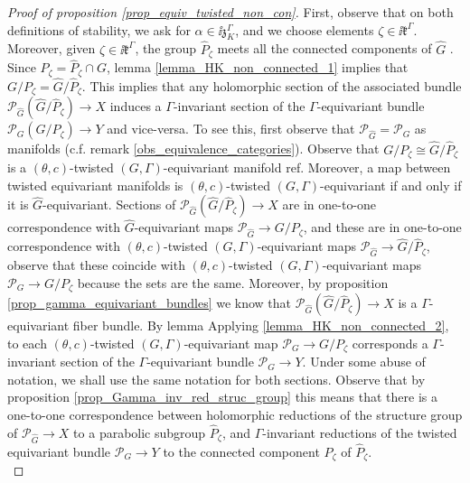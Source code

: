 {\begin{proof}[\textit{Proof of proposition} \ref{prop_equiv_twisted_non_con}]
    First, observe that on both definitions of stability, we ask for \(\alpha \in \ii \mathfrak{z}_K^\Gamma\), and we choose elements \(\zeta \in \ii \mathfrak{k}^\Gamma\). Moreover, given \(\zeta \in \ii \mathfrak{k}^\Gamma\), the group \(\hat{P}_\zeta\) meets all the connected components of \(\hat{G}\) \parencite[Prop. 2.12]{HKnonconnected}. Since \(P_\zeta=\hat{P}_\zeta \cap G\), lemma \ref{lemma_HK_non_connected_1} implies that \(G/P_\zeta=\hat{G}/\hat{P}_\zeta\). This implies that any holomorphic section of the associated bundle \(\mathcal{P}_{\hat{G}}(\hat{G}/\hat{P}_\zeta)\to X\) induces a \(\Gamma\)-invariant section of the \(\Gamma\)-equivariant bundle \(\mathcal{P}_{G}(G/P_\zeta)\to Y\) and vice-versa. To see this, first observe that \(\mathcal{P}_{\hat{G}}=\mathcal{P}_G\) as manifolds (c.f. remark \ref{obs_equivalence_categories}). Observe that \(G/P_\zeta\cong \hat{G}/\hat{P}_\zeta\) is a \((\theta,c)\)-twisted \((G, \Gamma)\)-equivariant manifold {\color{red}ref}. Moreover, a map between twisted equivariant manifolds is \((\theta,c)\)-twisted \((G, \Gamma)\)-equivariant if and only if it is \(\hat{G}\)-equivariant. Sections of \(\mathcal{P}_{\hat{G}}(\hat{G}/\hat{P}_\zeta)\to X\) are in one-to-one correspondence with \(\hat{G}\)-equivariant maps \(\mathcal{P}_{\hat{G}}\to G/P_\zeta\), and these are in one-to-one correspondence with \((\theta,c)\)-twisted \((G, \Gamma)\)-equivariant maps \(\mathcal{P}_{\hat{G}}\to \hat{G}/\hat{P}_\zeta\), observe that these coincide with \((\theta,c)\)-twisted \((G, \Gamma)\)-equivariant maps \(\mathcal{P}_{{G}}\to G/P_\zeta\) because the sets are the same. Moreover, by proposition \ref{prop_gamma_equivariant_bundles} we know that \(\mathcal{P}_{\hat{G}}(\hat{G}/\hat{P}_\zeta)\to X\) is a \(\Gamma\)-equivariant fiber bundle. By lemma Applying \ref{lemma_HK_non_connected_2}, to each \((\theta,c)\)-twisted \((G, \Gamma)\)-equivariant map \(\mathcal{P}_{{G}}\to G/P_\zeta\) corresponds a \(\Gamma\)-invariant section of the \(\Gamma\)-equivariant bundle \(\mathcal{P}_G \to Y\). Under some abuse of notation, we shall use the same notation for both sections. Observe that by proposition \ref{prop_Gamma_inv_red_struc_group} this means that there is a one-to-one correspondence between holomorphic reductions of the structure group of \(\mathcal{P}_{\hat{G}}\to X\) to a parabolic subgroup \(\hat{P}_\zeta\), and \(\Gamma\)-invariant reductions of the twisted equivariant bundle \(\mathcal{P}_G \to Y\) to the connected component \(P_\zeta\) of \(\hat{P}_\zeta\). \\


\end{proof}}
